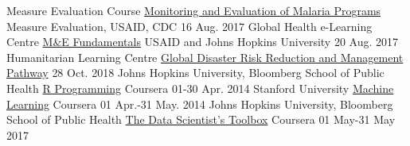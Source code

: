 

\begin{cventries}

  \cventry
    {Measure Evaluation Course} %
    {\href{https://www.dropbox.com/sh/rhdshqq6f29tsmw/AADoPyOlMCvnIj8I9QIumZHZa?dl=0}{Monitoring and Evaluation of Malaria Programs}} %
    {Measure Evaluation, USAID, CDC} %
    {16 Aug. 2017} %
    {
    }
\vspace{-.5\baselineskip}
  \cventry
    {Global Health e-Learning Centre} %
    {\href{https://www.dropbox.com/sh/rhdshqq6f29tsmw/AADoPyOlMCvnIj8I9QIumZHZa?dl=0}{M\&E Fundamentals}} %
    {USAID and Johns Hopkins University} %
    {20 Aug. 2017} %
    {
    }
\vspace{-.5\baselineskip}
  \cventry
    {Humanitarian Learning Centre} %
    {\href{https://www.dropbox.com/sh/nzts89php8qteq8/AACMqNvLvcueARs9NCKQoVsSa?dl=0}{Global Disaster Risk Reduction and Management Pathway}} %
    {} %
    {28  Oct. 2018} %
    {
    }
\vspace{-.5\baselineskip}
  \cventry
    {Johns Hopkins University, Bloomberg School of Public Health} %
    {\href{https://www.coursera.org/account/accomplishments/verify/LACEDLA2VR}{R Programming}} %
    {Coursera} %
    {01-30 Apr. 2014} %
    {
    }
\vspace{-.5\baselineskip}
  \cventry
    {Stanford University} %
    {\href{https://www.dropbox.com/sh/peulp7114qvd2y6/AADHfkLRA8exJW5V_EEmch9qa?dl=0}{Machine Learning}} %
    {Coursera} %
    {01 Apr.-31 May. 2014} %
    {
    }
\vspace{-.5\baselineskip}
  \cventry
    {Johns Hopkins University, Bloomberg School of Public Health} %
    {\href{https://www.coursera.org/account/accomplishments/verify/E88Q2HKY95KU}{The Data Scientist’s Toolbox}} %
    {Coursera} %
    {01 May-31 May 2017} %
    {
    }


\end{cventries}
